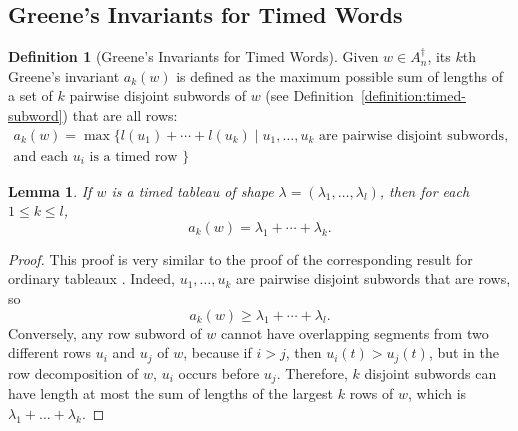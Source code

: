 \documentclass[10pt]{amsproc}
\newtheorem{lemma}[theorem]{Lemma}
\theoremstyle{definition}
\newtheorem{definition}[theorem]{Definition}
\theoremstyle{remark}
\begin{document}
\subsection{Greene's Invariants for Timed Words}
\label{sec:timed-greene-invar}
\begin{definition}[Greene's Invariants for Timed Words]
  \label{definition:timed-Greene-invars}
  Given $w\in A_n^\dagger$, its $k$th Greene's invariant $a_k(w)$ is defined as the maximum possible sum of lengths of a set of $k$ pairwise disjoint subwords of $w$ (see Definition~\ref{definition:timed-subword}) that are all rows:
  \begin{multline*}
    a_k(w) = \max\{l(u_1)+\dotsb+l(u_k)\mid u_1,\dotsc,u_k \text{ are pairwise disjoint subwords,}\\ \text{and each $u_i$ is a timed row }\}
  \end{multline*}
\end{definition}
\begin{lemma}
  \label{lemma:tableau-shape-greene}
  If $w$ is a timed tableau of shape $\lambda=(\lambda_1,\dotsc,\lambda_l)$, then for each $1\leq k\leq l$,
  \begin{displaymath}
    a_k(w) = \lambda_1+\dotsb + \lambda_k.
  \end{displaymath}
\end{lemma}
\begin{proof}
  This proof is very similar to the proof of the corresponding result for ordinary tableaux \cite{Greene-schen,Lascoux}.
  Indeed, $u_1,\dotsc,u_k$ are pairwise disjoint subwords that are rows, so
  \begin{displaymath}
    a_k(w) \geq \lambda_1+\dotsb + \lambda_l.
  \end{displaymath}
  Conversely, any row subword of $w$ cannot have overlapping segments from two different rows $u_i$ and $u_j$ of $w$, because if $i>j$, then $u_i(t)>u_j(t)$, but in the row decomposition of $w$, $u_i$ occurs before $u_j$.
  Therefore, $k$ disjoint subwords can have length at most the sum of lengths of the largest $k$ rows of $w$, which is $\lambda_1+\dotsc+\lambda_k$.
\end{proof}
\end{document}
